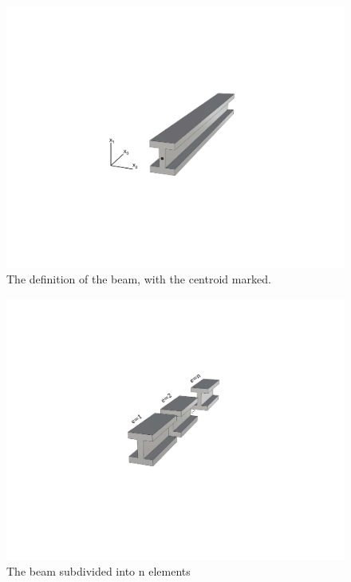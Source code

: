 \begin{figure}[htb]
\centering
\includegraphics[width=0.7\columnwidth,trim=4cm 7cm 6cm 6cm, clip]{figs/cog.pdf}
\caption{The definition of the beam, with the centroid marked.}
 \label{fig:beam_definition}
\end{figure}


\begin{figure}
\centering
\includegraphics[width=0.7\columnwidth,trim=4cm 7cm 6cm 6cm, clip]{figs/elements.pdf}
\caption{The beam subdivided into n elements}
\label{fig:subdivision}
\end{figure}


